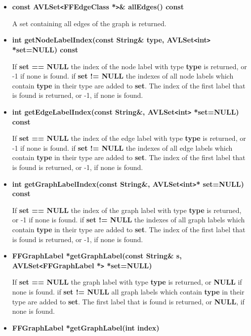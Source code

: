 \begin{itemize}
A set containing all nodes of the graph is returned.

\item{\bf const AVLSet\verb|<|FFEdgeClass *\verb|>|\& allEdges()
    const}

A set containing all edges of the graph is returned.

\item{\bf int getNodeLabelIndex(const String\& type,
    AVLSet\verb|<|int\verb|>| *set=NULL) const}
  
  If {\bf set == NULL} the index of the node label with type {\bf
    type} is returned, or -1 if none is found.  if {\bf set !=
    NULL} the indexes of all node labels which contain {\bf type}
  in their type are added to {\bf set}. The index of the first
  label that is found is returned, or -1, if none is found.
  
\item{\bf int getEdgeLabelIndex(const String\&,
    AVLSet\verb|<|int\verb|>| *set=NULL) const}
  
  If {\bf set == NULL} the index of the edge label with type {\bf
    type} is returned, or -1 if none is found.  if {\bf set !=
    NULL} the indexes of all edge labels which contain {\bf type}
  in their type are added to {\bf set}. The index of the first
  label that is found is returned, or -1, if none is found.
  
\item{\bf int getGraphLabelIndex(const String\&,
    AVLSet\verb|<|int\verb|>|* set=NULL) const}
  
  If {\bf set == NULL} the index of the graph label with type
  {\bf type} is returned, or -1 if none is found.  if {\bf set !=
    NULL} the indexes of all graph labels which contain {\bf
    type} in their type are added to {\bf set}. The index of the
  first label that is found is returned, or -1, if none is found.
  
\item{\bf FFGraphLabel *getGraphLabel(const String\& s,
    AVLSet\verb|<|FFGraphLabel *\verb|>| *set=NULL)}
  
  If {\bf set == NULL} the graph label with type {\bf type}
  is returned, or {\bf NULL} if none is found.  if {\bf set !=
    NULL} all graph labels which contain {\bf type} in their type
  are added to {\bf set}. The first label that is found is
  returned, or {\bf NULL}, if none is found.

\item{\bf FFGraphLabel *getGraphLabel(int index)}
  

\end{itemize}
